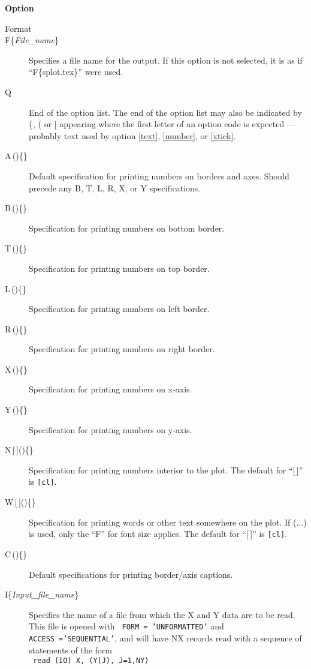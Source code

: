 \documentclass[twoside]{MATH77}
\begin{document}
\begin{multicols}{2}
{\bf Option}\vspace{-12pt}
\begin{description}
\item[Format] \hspace{.5in}{\bf Option Description}

\item[F\{{\em File\_name}\}] Specifies a file name for the output.
If this option is not selected, it is as if ``F\{splot.tex\}'' were used.
\item[Q]   End of the option list.  The end of the option list may also be
           indicated by \{, ( or [ appearing where the first letter of an
           option code is expected --- probably text used by option
           \ref{text}, \ref{number}, or \ref{xtick}.
\item[A\,()\{\}] Default specification for printing numbers on
borders and axes.  Should precede any B, T, L, R, X, or Y specifications.
\item[B\,()\{\}] Specification for printing numbers on
bottom border.
\item[T\,()\{\}] Specification for printing numbers on
top border.
\item[L\,()\{\}] Specification for printing numbers on
left border.
\item[R\,()\{\}] Specification for printing numbers on
right border.
\item[X\,()\{\}] Specification for printing numbers on
x-axis.
\item[Y\,()\{\}] Specification for printing numbers on
y-axis.
\item[N\,\hbox{[\,]}()\{\}] Specification for printing numbers
interior to the plot.  The default for ``[\,]'' is {\tt [cl]}.
\item[W\,\hbox{[\,]}()\{\}] Specification for printing words or other
  text somewhere on the plot.  If (...) is used, only the ``F'' for
  font size applies.  The default for ``[\,]'' is {\tt [cl]}.
\item[C\,()\{\}] Default specifications for printing border/axis
captions.
\item[I\{{\em Input\_file\_name}\}] Specifies the name of a file from
which the X and Y data are to be read.  This file is opened with {\tt
FORM~= 'UNFORMATTED'} and {\tt ACCESS~='SEQUENTIAL'}, and will have NX
records read with a sequence of statements of the form\\
{\tt \hspace*{0.125in}   read (IO) X, (Y(J), J=1,NY)}\\

\end{description}
\end{multicols}
\end{document}

